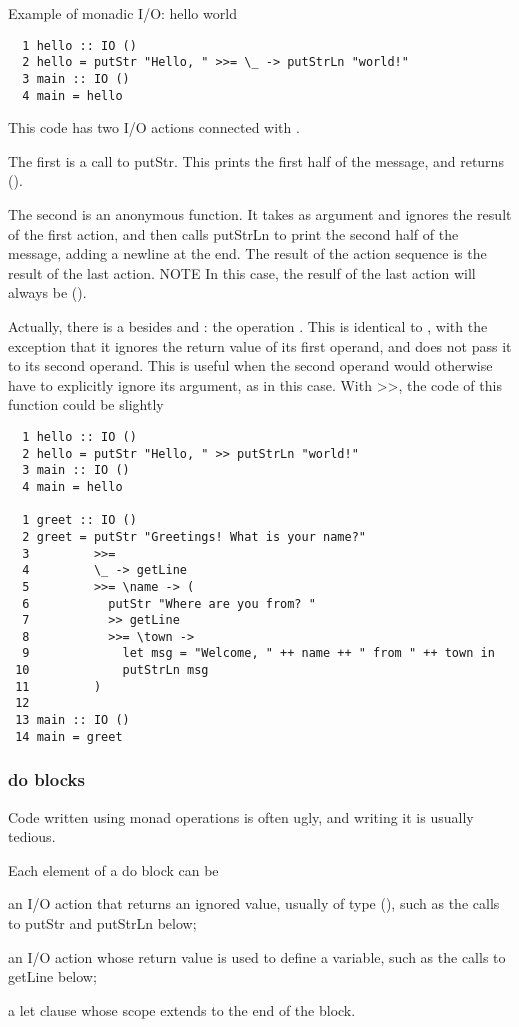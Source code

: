 Example of monadic I/O: hello world
\begin{lstlisting}
  1 hello :: IO ()
  2 hello = putStr "Hello, " >>= \_ -> putStrLn "world!"
  3 main :: IO ()
  4 main = hello
\end{lstlisting}
\begin{compactitem}
\item This code has two I/O actions connected with \e{$>>=$}.
\item The first is a call to putStr. This prints the
first half of the message, and returns ().
\item The second is an anonymous function. It takes
as argument and ignores the result of the first
action, and then calls putStrLn to print the
second half of the message, adding a newline
at the end.
The result of the action sequence is the result of the
last action.
NOTE In this case, the resulf of the last action will
always be ().

Actually, there is a  besides
 and \e{>>=}: the operation \e{>>}. This is identical
to \e{>>=}, with the exception that it ignores the return
value of its first operand, and does not pass it to
its second operand. This is useful when the second
operand would otherwise have to explicitly ignore
its argument, as in this case.
With >>, the code of this function could be slightly
\begin{lstlisting}
  1 hello :: IO ()
  2 hello = putStr "Hello, " >> putStrLn "world!"
  3 main :: IO ()
  4 main = hello
  
  1 greet :: IO ()
  2 greet = putStr "Greetings! What is your name?"
  3         >>=
  4         \_ -> getLine
  5         >>= \name -> (
  6           putStr "Where are you from? "
  7           >> getLine
  8           >>= \town ->
  9             let msg = "Welcome, " ++ name ++ " from " ++ town in
 10             putStrLn msg
 11         )
 12
 13 main :: IO ()
 14 main = greet
\end{lstlisting}
\end{compactitem}

\subsubsection{do blocks}
Code written using monad operations is often ugly,
and writing it is usually tedious. 

Each element of a do block can be
\begin{compactitem} 
\item an I/O action that returns an ignored value,
usually of type (), such as the calls to putStr
and putStrLn below;
\item an I/O action whose return value is used to
define a variable, such as the calls to getLine
below;
\item a let clause whose scope extends to the end of
the block.
\end{compactitem}

